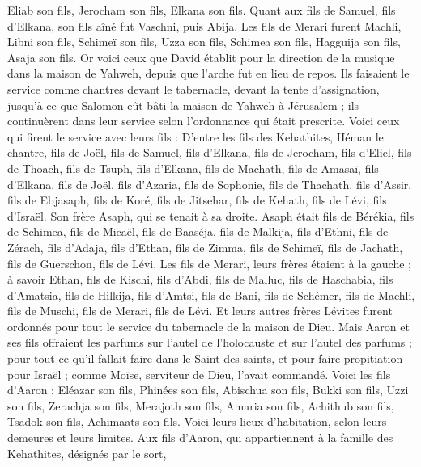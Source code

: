 \begin{multicols}{2}
Eliab son fils, Jerocham son fils, Elkana son fils.
Quant aux fils de Samuel, fils d'Elkana, son fils aîné fut Vaschni, puis Abija.
Les fils de Merari furent Machli, Libni son fils, Schimeï son fils, Uzza son fils,
Schimea son fils, Hagguija son fils, Asaja son fils.
Or voici ceux que David établit pour la direction de la musique dans la maison de Yahweh, depuis que l'arche fut en lieu de repos.
Ils faisaient le service comme chantres devant le tabernacle, devant la tente d'assignation, jusqu'à ce que Salomon eût bâti la maison de Yahweh à Jérusalem ; ils continuèrent dans leur service selon l'ordonnance qui était prescrite.
Voici ceux qui firent le service avec leurs fils : D'entre les fils des Kehathites, Héman le chantre, fils de Joël, fils de Samuel,
fils d'Elkana, fils de Jerocham, fils d'Eliel, fils de Thoach,
fils de Tsuph, fils d'Elkana, fils de Machath, fils de Amasaï,
fils d'Elkana, fils de Joël, fils d'Azaria, fils de Sophonie,
fils de Thachath, fils d'Assir, fils de Ebjasaph, fils de Koré,
fils de Jitsehar, fils de Kehath, fils de Lévi, fils d'Israël.
Son frère Asaph, qui se tenait à sa droite. Asaph était fils de Bérékia, fils de Schimea,
fils de Micaël, fils de Baaséja, fils de Malkija,
fils d'Ethni, fils de Zérach, fils d'Adaja,
fils d'Ethan, fils de Zimma, fils de Schimeï,
fils de Jachath, fils de Guerschon, fils de Lévi.
Les fils de Merari, leurs frères étaient à la gauche ; à savoir Ethan, fils de Kischi, fils d'Abdi, fils de Malluc,
fils de Haschabia, fils d'Amatsia, fils de Hilkija,
fils d'Amtsi, fils de Bani, fils de Schémer,
fils de Machli, fils de Muschi, fils de Merari, fils de Lévi.
Et leurs autres frères Lévites furent ordonnés pour tout le service du tabernacle de la maison de Dieu.
Mais Aaron et ses fils offraient les parfums sur l'autel de l'holocauste et sur l'autel des parfums ; pour tout ce qu'il fallait faire dans le Saint des saints, et pour faire propitiation pour Israël ; comme Moïse, serviteur de Dieu, l'avait commandé.
Voici les fils d'Aaron : Eléazar son fils, Phinées son fils, Abischua son fils,
Bukki son fils, Uzzi son fils, Zerachja son fils,
Merajoth son fils, Amaria son fils, Achithub son fils,
Tsadok son fils, Achimaats son fils.
Voici leurs lieux d'habitation, selon leurs demeures et leurs limites. Aux fils d'Aaron, qui appartiennent à la famille des Kehathites, désignés par le sort,

\end{multicols}
